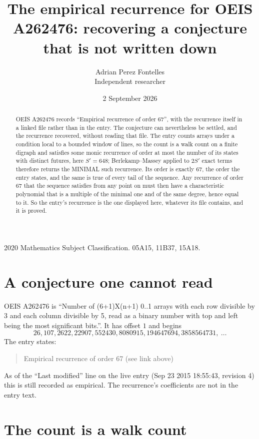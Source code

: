 \documentclass[11pt,a4paper]{article}
\title{The empirical recurrence for OEIS A262476: recovering a conjecture that is not written down}
\author{Adrian Perez Fontelles\\ \small Independent researcher}
\date{2 September 2026}
\theoremstyle{plain}
\theoremstyle{definition}
\begin{document}
\maketitle

\begin{abstract}
OEIS A262476 records ``Empirical recurrence of order $67$'', with the recurrence itself in a
linked file rather than in the entry. The conjecture can nevertheless be settled, and the
recurrence recovered, without reading that file. The entry counts arrays under a condition
local to a bounded window of lines, so the count is a walk count on a finite digraph and
satisfies some monic recurrence of order at most the number of its states with distinct
futures, here $S'=648$; Berlekamp--Massey applied to $2S'$ exact
terms therefore returns the MINIMAL such recurrence. Its order is exactly $67$, the order
the entry states, and the same is true of every tail of the sequence. Any recurrence of order
$67$ that the sequence satisfies from any point on must then have a characteristic
polynomial that is a multiple of the minimal one and of the same degree, hence equal to it. So
the entry's recurrence is the one displayed here, whatever its file contains, and it is
proved.
\end{abstract}

\noindent\small 2020 Mathematics Subject Classification. 05A15, 11B37, 15A18.\normalsize

\section{A conjecture one cannot read}

OEIS A262476 is ``Number of (6+1)X(n+1) 0..1 arrays with each row divisible by 3 and each column divisible by 5, read as a binary number with top and left being the most significant bits.''. It has offset $1$ and begins
\[
26, 107, 2622, 22907, 552430, 8080915, 194647694, 3858564731,\ \dots
\]
The entry states:
\begin{quote}
Empirical recurrence of order 67 (see link above)
\end{quote}
As of the ``Last modified'' line on the live entry (Sep 23 2015 18:55:43, revision 4) this is still
recorded as empirical. The recurrence's coefficients are not in the entry text.

\section{The count is a walk count}
\end{document}
